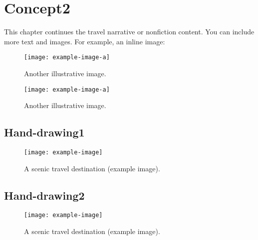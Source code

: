 \newpage
\section{Concept2}
This chapter continues the travel narrative or nonfiction content. You can include more text and images. For example, an inline image:
\begin{figure}[htbp]
  \centering
  \texttt{[image: example-image-a]} 
  \caption{Another illustrative image.}
\end{figure}
\lipsum[1]  %
\begin{figure}[htbp]
  \centering
  \texttt{[image: example-image-a]} 
  \caption{Another illustrative image.}
\end{figure}
\lipsum[2]  %


\newpage
\subsection{Hand-drawing1}
\lipsum[1]  %
\begin{figure}[htbp]
  \centering
  \texttt{[image: example-image]} %
  \caption{A scenic travel destination (example image).}
\end{figure}


\newpage
\subsection{Hand-drawing2}
\lipsum[1]  %
\begin{figure}[htbp]
  \centering
  \texttt{[image: example-image]} %
  \caption{A scenic travel destination (example image).}
\end{figure}

